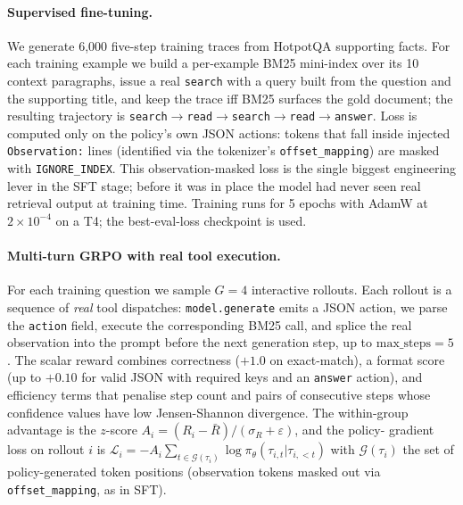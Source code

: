 \documentclass[11pt]{article}
\begin{document}
\paragraph{Supervised fine-tuning.}
We generate 6{,}000 five-step training traces from HotpotQA
supporting facts. For each training example we build a per-example
BM25 mini-index over its 10 context paragraphs, issue a real
\texttt{search} with a query built from the question and the
supporting title, and keep the trace iff BM25 surfaces the gold
document; the resulting trajectory is
\texttt{search}$\to$\texttt{read}$\to$\texttt{search}$\to$\texttt{read}$\to$\texttt{answer}.
Loss is computed only on the policy's own JSON actions: tokens
that fall inside injected \texttt{Observation:} lines (identified
via the tokenizer's \texttt{offset\_mapping}) are masked with
\texttt{IGNORE\_INDEX}. This observation-masked loss is the
single biggest engineering lever in the SFT stage; before it was
in place the model had never seen real retrieval output at
training time. Training runs for 5 epochs with AdamW at
$2{\times}10^{-4}$ on a T4; the best-eval-loss checkpoint is used.

\paragraph{Multi-turn GRPO with real tool execution.}
For each training question we sample $G{=}4$ interactive rollouts.
Each rollout is a sequence of \emph{real} tool dispatches:
\texttt{model.generate} emits a JSON action, we parse the
\texttt{action} field, execute the corresponding BM25 call, and
splice the real observation into the prompt before the next
generation step, up to $\mathrm{max\_steps}{=}5$. The scalar reward
combines correctness ($+1.0$ on exact-match), a format score (up
to $+0.10$ for valid JSON with required keys and an
\texttt{answer} action), and efficiency terms that penalise step
count and pairs of consecutive steps whose confidence values have
low Jensen-Shannon divergence. The within-group advantage is the
$z$-score
$A_i = (R_i - \bar R)/(\sigma_R + \varepsilon)$, and the policy-
gradient loss on rollout $i$ is
$\mathcal{L}_i = -A_i \sum_{t\in\mathcal{G}(\tau_i)} \log \pi_\theta(\tau_{i,t}|\tau_{i,<t})$
with $\mathcal{G}(\tau_i)$ the set of policy-generated token
positions (observation tokens masked out via
\texttt{offset\_mapping}, as in SFT).
\end{document}
